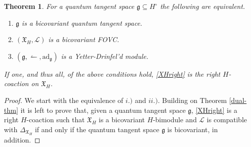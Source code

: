 \documentclass{article}
\newtheorem{theorem}[thm]{Theorem}
\theoremstyle{definition}
\begin{document}
	\begin{theorem}\label{thm:bicovVF}
		For a quantum tangent space $\mathfrak{g}\subseteq H^\circ$ the following are equivalent.
		\begin{enumerate}
			\item[i.)] $\mathfrak{g}$ is a bicovariant quantum tangent space.
			\item[ii.)] $(\mathfrak{X}_H,\mathscr{L})$ is a bicovariant FOVC.
			\item[iii.)] $(\mathfrak{g},\leftharpoonup,\mathrm{ad}_\mathfrak{g})$ is a Yetter-Drinfel'd module.
		\end{enumerate}
		If one, and thus all, of the above conditions hold, \eqref{XHright} is the right $H$-coaction on $\mathfrak{X}_H$.
	\end{theorem}
	\begin{proof}
		We start with the equivalence of $i.)$ and $ii.)$. Building on Theorem \ref{dual-thm} it is left to prove that, given a quantum tangent space $\mathfrak{g}$, \eqref{XHright} is a right $H$-coaction such that $\mathfrak{X}_H$ is a bicovariant $H$-bimodule and $\mathscr{L}$ is compatible with $\Delta_{\mathfrak{X}_H}$ if and only if the quantum tangent space $\mathfrak{g}$ is bicovariant, in addition.
		

\end{proof}
\end{document}
